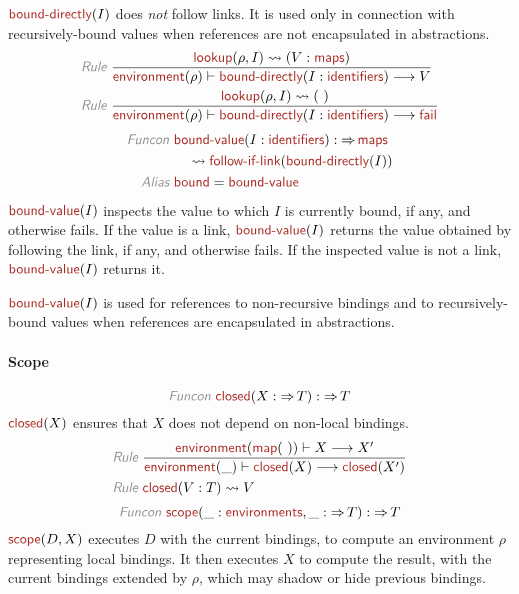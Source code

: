 \documentclass[fleqn]{article}
\newcommand{\KEY}[1]{\textsf{\textit{\color{Gray}#1}}}
\newcommand{\NAME}[2][\PLAIN]{#1{Name_#2}{\textsf{\color{Mahogany}#2}}}
\newcommand{\PLAIN}[1]{}
\newcommand{\RULE}[2]{\frac{#1}{#2}}
\newcommand{\TO}{\mathop{\Rightarrow}}
\newcommand{\TRANS}{\longrightarrow}
\begin{document}
$ \NAME{bound-directly}(I) $ does \textit{not} follow links. It is used only in connection with
recursively-bound values when references are not encapsulated in abstractions.
% 
\begin{align*}
  \KEY{Rule} ~ 
  & \RULE{
    \NAME{lookup}(\rho, I) \leadsto (V:\NAME{maps})
    }{
    \NAME{environment}(\rho) \vdash \NAME{bound-directly}(I:\NAME{identifiers}) \TRANS V
    }
\\
  \KEY{Rule} ~ 
  & \RULE{
    \NAME{lookup}(\rho, I) \leadsto (~)
    }{
    \NAME{environment}(\rho) \vdash \NAME{bound-directly}(I:\NAME{identifiers}) \TRANS \NAME{fail}
    }
\end{align*}
% 
\begin{align*}
  \KEY{Funcon} ~
  & \NAME{bound-value}(I:\NAME{identifiers}) : \TO \NAME{maps}
\\
  & \quad {} \leadsto \NAME{follow-if-link}(\NAME{bound-directly}(I))
\\
  \KEY{Alias} ~
  & \NAME{bound} = \NAME{bound-value}
\end{align*}
% 
$ \NAME{bound-value}(I) $ inspects the value to which $ I $ is currently bound, if any,
and otherwise fails. If the value is a link, $ \NAME{bound-value}(I) $ returns the
value obtained by following the link, if any, and otherwise fails. If the 
inspected value is not a link, $ \NAME{bound-value}(I) $ returns it. 

$ \NAME{bound-value}(I) $ is used for references to non-recursive bindings and to
recursively-bound values when references are encapsulated in abstractions.
\paragraph*{Scope}
% 
\[ %
\KEY{Funcon} ~
  \NAME{closed}(X:\TO T) : \TO T
\] %
% 
$ \NAME{closed}(X) $ ensures that $ X $ does not depend on non-local bindings.
% 
\begin{align*}
  \KEY{Rule} ~ 
  & \RULE{
    \NAME{environment}(\NAME{map}(~)) \vdash X \TRANS X'
    }{
    \NAME{environment}(\_) \vdash \NAME{closed}(X) \TRANS \NAME{closed}(X')
    }
\\
  \KEY{Rule} ~
  & \NAME{closed}(V:T) \leadsto V
\end{align*}
% 
\[ %
\KEY{Funcon} ~
  \NAME{scope}(\_:\NAME{environments}, \_:\TO T) : \TO T
\] %
% 
$ \NAME{scope}(D,X) $ executes $ D $ with the current bindings, to compute an environment
$ \rho $ representing local bindings. It then executes $ X $ to compute the result,
with the current bindings extended by $ \rho $, which may shadow or hide previous
bindings.
\end{document}

